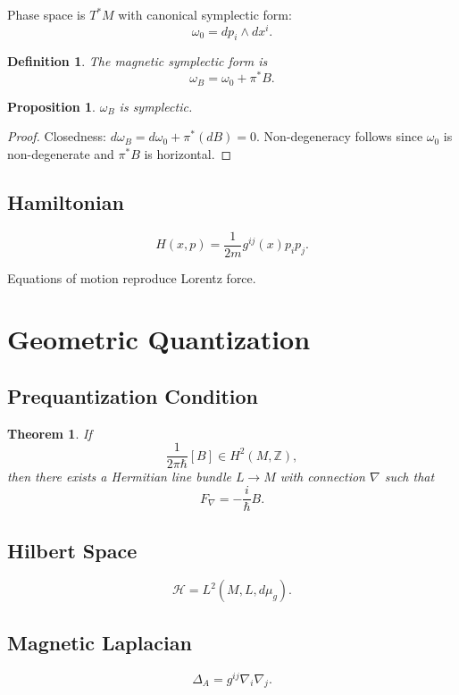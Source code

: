 \documentclass[11pt]{article}
\newtheorem{theorem}{Theorem}
\newtheorem{proposition}{Proposition}
\newtheorem{definition}{Definition}
\begin{document}
Phase space is $T^*M$ with canonical symplectic form:
\[
\omega_0 = dp_i \wedge dx^i.
\]

\begin{definition}
The magnetic symplectic form is
\[
\omega_B = \omega_0 + \pi^* B.
\]
\end{definition}

\begin{proposition}
$\omega_B$ is symplectic.
\end{proposition}

\begin{proof}
Closedness: $d\omega_B = d\omega_0 + \pi^*(dB)=0$.  
Non-degeneracy follows since $\omega_0$ is non-degenerate and $\pi^*B$ is horizontal.
\end{proof}

\subsection{Hamiltonian}

\[
H(x,p)=\frac{1}{2m} g^{ij}(x)p_i p_j.
\]

Equations of motion reproduce Lorentz force.

\section{Geometric Quantization}

\subsection{Prequantization Condition}

\begin{theorem}
If
\[
\frac{1}{2\pi\hbar}[B]\in H^2(M,\mathbb{Z}),
\]
then there exists a Hermitian line bundle $L\to M$ with connection $\nabla$ such that
\[
F_\nabla = -\frac{i}{\hbar}B.
\]
\end{theorem}

\subsection{Hilbert Space}

\[
\mathcal{H}=L^2(M,L,d\mu_g).
\]

\subsection{Magnetic Laplacian}

\[
\Delta_A = g^{ij}\nabla_i\nabla_j.
\]
\end{document}
